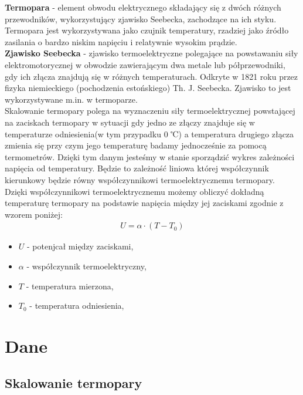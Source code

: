 \documentclass[11pt]{article}
\begin{document}
    \noindent\textbf{Termopara} - element obwodu elektrycznego składający
    się z dwóch różnych przewodników, wykorzystujący
    zjawisko Seebecka, zachodzące na ich styku. Termopara
    jest wykorzystywana jako czujnik temperatury, rzadziej
    jako źródło zasilania o bardzo niskim napięciu i relatywnie
    wysokim prądzie.\\

    \noindent\textbf{Zjawisko Seebecka} - zjawisko termoelektryczne polegające na powstawaniu siły elektromotorycznej w
    obwodzie zawierającym dwa metale lub półprzewodniki, gdy ich złącza znajdują się w różnych
    temperaturach. Odkryte w 1821 roku przez fizyka niemieckiego (pochodzenia estońskiego)
    Th. J. Seebecka. Zjawisko to jest wykorzystywane m.in. w termoparze.\\

    \indent Skalowanie termopary polega na wyznaczeniu siły termoelektrycznej powstającej na zaciskach
    termopary w sytuacji gdy jedno ze złączy znajduje się w temperaturze odniesienia(w tym przypadku
    0 ℃) a temperatura drugiego złącza zmienia się przy czym jego temperaturę badamy jednocześnie za
    pomocą termometrów. Dzięki tym danym jesteśmy w stanie sporządzić wykres zależności napięcia od
    temperatury. Będzie to zależność liniowa której współczynnik kierunkowy będzie równy
    współczynnikowi termoelektrycznemu termopary.\\
    \newpage
    \indent Dzięki współczynnikowi termoelektrycznemu możemy obliczyć dokładną temperaturę termopary na
    podstawie napięcia między jej zaciskami zgodnie z wzorem poniżej:
    \begin{gather*}
        U=\alpha\cdot(T-T_0)
    \end{gather*}
    {\footnotesize
        \begin{itemize}
            \item[] $U$ - potenjcał między zaciskami,
            \item[] $\alpha$ - współczynnik termoelektryczny,
            \item[] $T$ - temperatura mierzona,
            \item[] $T_0$ - temperatura odniesienia,
        \end{itemize}}

    \section{Dane}
    \subsection*{Skalowanie termopary}
    \begin{center}
    \end{center}
\end{document}
